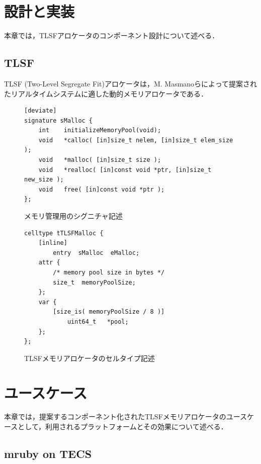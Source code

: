 \documentclass[submit]{ipsj_v2/UTF8/ipsj}
\begin{document}
\section{設計と実装}
\label{sec:DesignImplementation}

本章では，TLSFアロケータのコンポーネント設計について述べる．


\subsection{TLSF}
\label{sec:TLSF}
TLSF (Two-Level Segregate Fit)アロケータは，M. Masmanoらによって提案されたリアルタイムシステムに適した動的メモリアロケータである．

\begin{figure}[t]
\centering
\begin{lstlisting}
[deviate]
signature sMalloc {
    int    initializeMemoryPool(void);
    void   *calloc( [in]size_t nelem, [in]size_t elem_size );
    void   *malloc( [in]size_t size );
    void   *realloc( [in]const void *ptr, [in]size_t new_size );
    void   free( [in]const void *ptr );
};
\end{lstlisting}
\caption{メモリ管理用のシグニチャ記述}  
\label{src:TLSFSignature}
\end{figure}

\begin{figure}[t]
\centering
\begin{lstlisting}
celltype tTLSFMalloc {
    [inline]
        entry  sMalloc  eMalloc;
    attr {
        /* memory pool size in bytes */
        size_t  memoryPoolSize;
    };
    var {
        [size_is( memoryPoolSize / 8 )]
            uint64_t   *pool;
    };
};
\end{lstlisting}
\caption{TLSFメモリアロケータのセルタイプ記述}  
\label{src:TLSFCelltype}
\end{figure}

\section{ユースケース}
\label{sec:UseCase}

本章では，提案するコンポーネント化されたTLSFメモリアロケータのユースケースとして，利用されるプラットフォームとその効果について述べる．

\subsection{mruby on TECS}
\label{sec:mrubyonTECS}
\end{document}
